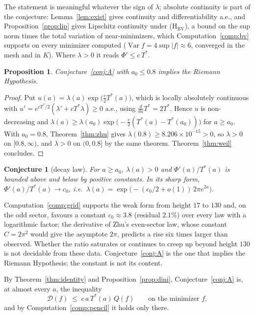 \documentclass[11pt]{article}
\newtheorem{proposition}[theorem]{Proposition}
\newtheorem{conjecture}[theorem]{Conjecture}
\theoremstyle{definition}
\theoremstyle{remark}
\newcommand{\Tst}{T^{*}}
\begin{document}
The statement is meaningful whatever the sign of $\lambda$; absolute continuity is part of the conjecture: Lemma~\ref{lem:exist} gives continuity and differentiability a.e., and Proposition~\ref{prop:lip} gives Lipschitz continuity under (H$_{\mathrm{BV}}$), a bound on the sup norm times the total variation of near-minimizers, which Computation~\ref{comp:bv} supports on every minimizer computed ($\operatorname{Var}f=4\sup|f|\approx6$, converged in the mesh and in $K$). Where $\lambda>0$ it reads $\Phi'\le c\,\Tst$.

\begin{proposition}\label{prop:AimpliesRH}
Conjecture~\ref{conj:A} with $a_0\le0.8$ implies the Riemann Hypothesis.
\end{proposition}
\begin{proof}
Put $u(a)=\lambda(a)\exp\big(\tfrac c2\Tst(a)\big)$, which is locally absolutely continuous with $u'=e^{c\Tst/2}(\lambda'+c\Tst\lambda)\ge0$ a.e., using $\frac{d}{da}\Tst=2\Tst$. Hence $u$ is non-decreasing and $\lambda(a)\ge\lambda(a_0)\exp\big(-\tfrac c2(\Tst(a)-\Tst(a_0))\big)$ for $a\ge a_0$. With $a_0=0.8$, Theorem~\ref{thm:zhu} gives $\lambda(0.8)\ge8.206\times10^{-15}>0$, so $\lambda>0$ on $[0.8,\infty)$, and $\lambda>0$ on $(0,0.8]$ by the same theorem. Theorem~\ref{thm:weil} concludes.
\end{proof}

\begin{conjecture}[decay law]\label{conj:B}
For $a\ge a_0$, $\lambda(a)>0$ and $\Phi'(a)/\Tst(a)$ is bounded above and below by positive constants. In its sharp form, $\Phi'(a)/\Tst(a)\to c_0$, i.e.\ $\lambda(a)=\exp\big(-(c_0/2+o(1))\,2\pi e^{2a}\big)$.
\end{conjecture}

Computation~\ref{comp:grid} supports the weak form from height $17$ to $130$ and, on the odd sector, favours a constant $c_0\approx3.8$ (residual $2.1\%$) over every law with a logarithmic factor; the derivative of Zhu's even-sector law, whose constant $C=2\pi^2$ would give the asymptote $2\pi$, predicts a rise six times larger than observed. Whether the ratio saturates or continues to creep up beyond height $130$ is not decidable from these data. Conjecture~\ref{conj:A} is the one that implies the Riemann Hypothesis; the constant is not its content.

By Theorem~\ref{thm:identity} and Proposition~\ref{prop:dini}, Conjecture~\ref{conj:A} is, at almost every $a$, the inequality
\begin{equation}\label{eq:Aform}
\mathcal D(f)\;\le\;c\,a\,\Tst(a)\,Q(f)\qquad\text{on the minimizer } f,
\end{equation}
and by Computation~\ref{comp:pencil} it holds only there.
\end{document}

